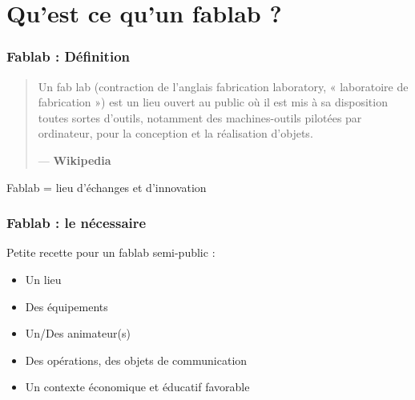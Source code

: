 \documentclass[10pt, compress]{beamer}
\begin{document}
	\section{Qu'est ce qu'un fablab ?}
	\begin{frame}
		\frametitle{Fablab : Définition}
		\begin{quotation}
			Un fab lab (contraction de l'anglais fabrication laboratory, « laboratoire de fabrication ») est un lieu ouvert au
			public où il est mis à sa disposition toutes sortes d'outils, notamment des machines-outils pilotées par
			ordinateur, pour la conception et la réalisation d'objets.\\
			\begin{flushright}
			--- \textbf{Wikipedia}
			\end{flushright}
		\end{quotation}
		\pause

		\begin{center}
			\large Fablab = \alert{lieu d'échanges et d'innovation}
		\end{center}
	\end{frame}

	\begin{frame}
		\frametitle{Fablab : le nécessaire}

		Petite recette pour un fablab semi-public :

		\pause

		\begin{itemize}[<+->]
			\item Un \alert{lieu}
			\item Des \alert{équipements}
			\item Un/Des animateur(s)
			\item Des opérations, des objets de \alert{communication}
			\item Un \alert{contexte} économique et éducatif \alert{favorable}
		\end{itemize}
	\end{frame}
\end{document}

